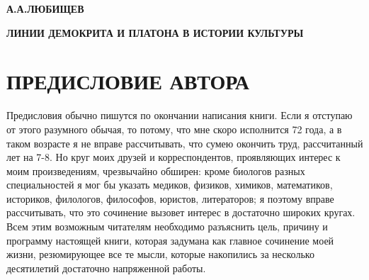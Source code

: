 
\begin{center}
  \textbf{А.А.ЛЮБИЩЕВ}
\end{center}


\begin{center}
  \textbf{ЛИНИИ ДЕМОКРИТА И ПЛАТОНА В ИСТОРИИ КУЛЬТУРЫ}
\end{center}

\clearpage

\section{ПРЕДИСЛОВИЕ АВТОРА}

Предисловия обычно пишутся по окончании написания книги. Если я
отступаю от этого разумного обычая, то потому, что мне скоро
исполнится 72 года, а в таком возрасте я не вправе рассчитывать, что
сумею окончить труд, рассчитанный лет на 7-8. Но круг моих друзей и
корреспондентов, проявляющих интерес к моим произведениям, чрезвычайно
обширен: кроме биологов разных специальностей я мог бы указать
медиков, физиков, химиков, математиков, историков, филологов,
философов, юристов, литераторов; я поэтому вправе рассчитывать, что
это сочинение вызовет интерес в достаточно широких кругах. Всем этим
возможным читателям необходимо разъяснить цель, причину и программу
настоящей книги, которая задумана как главное сочинение моей жизни,
резюмирующее все те мысли, которые накопились за несколько десятилетий
достаточно напряженной работы.

